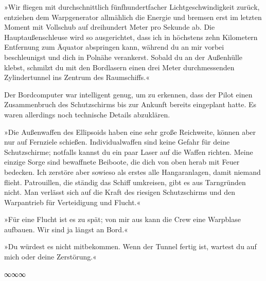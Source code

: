 »Wir fliegen mit durchschnittlich fünfhundertfacher Lichtgeschwindigkeit zurück, entziehen dem Warpgenerator allmählich die Energie und bremsen erst im letzten Moment mit Vollschub auf dreihundert Meter pro Sekunde ab. Die Hauptaußenschleuse wird so ausgerichtet, dass ich in höchstens zehn Kilometern Entfernung zum Äquator abspringen kann, während du an mir vorbei beschleunigst und dich in Polnähe verankerst. Sobald du an der Außenhülle klebst, schmilzt du mit den Bordlasern einen drei Meter durchmessenden Zylindertunnel ins Zentrum des Raumschiffs.«

Der Bordcomputer war intelligent genug, um zu erkennen, dass der Pilot einen Zusammenbruch des Schutzschirms bis zur Ankunft bereits eingeplant hatte. Es waren allerdings noch technische Details abzuklären. 

»Die Außenwaffen des Ellipsoids haben eine sehr große Reichweite, können aber nur auf Fernziele schießen. Individualwaffen sind keine Gefahr für deine Schutzschirme; notfalls kannst du ein paar Laser auf die Waffen richten. Meine einzige Sorge sind bewaffnete Beiboote, die dich von oben herab mit Feuer bedecken. Ich zerstöre aber sowieso als erstes alle Hangaranlagen, damit niemand flieht. Patrouillen, die ständig das Schiff umkreisen, gibt es aus Tarngründen nicht. Man verlässt sich auf die Kraft des riesigen Schutzschirms und den Warpantrieb für Verteidigung und Flucht.«


»Für eine Flucht ist es zu spät; von mir aus kann die Crew eine Warpblase aufbauen. Wir sind ja längst an Bord.«


»Du würdest es nicht mitbekommen. Wenn der Tunnel fertig ist, wartest du auf mich oder deine Zerstörung.«

\begin{center}
	∞∞∞
\end{center}

